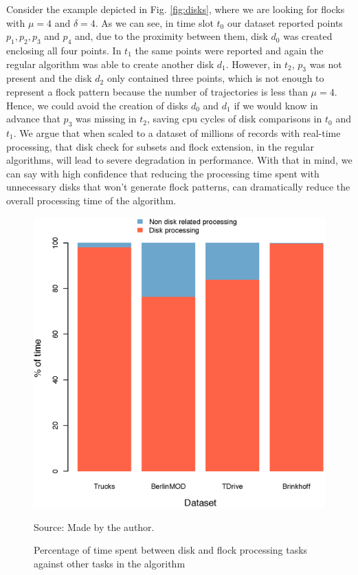 Consider the example depicted in Fig. \ref{fig:disks}, where we are looking for flocks with $\mu=4$ and $\delta=4$. As
we can see, in time slot $t_0$ our dataset reported points $p_1,p_2,p_3$ and $p_4$ and, due to the proximity between
them, disk $d_0$ was created enclosing all four points. In $t_1$ the same points were reported and again the regular
algorithm was able to create another disk $d_1$. However, in $t_2$, $p_3$ was not present and the disk $d_2$ only
contained three points, which is not enough to represent a flock pattern because the number of trajectories is less than
$\mu = 4$. Hence, we could avoid the creation of disks $d_0$ and $d_1$ if we would know in advance that $p_3$ was
missing in $t_2$, saving \ac{cpu} cycles of disk comparisons in $t_0$ and $t_1$. We argue that when scaled to a dataset
of millions of records with real-time processing, that disk check for subsets and flock extension, in the regular
algorithms, will lead to severe degradation in performance. With that in mind, we can say with high confidence that
reducing the processing time spent with unnecessary disks that won't generate flock patterns, can dramatically reduce
the overall processing time of the algorithm.

\begin{figure}[h!]
    \centering
    \caption{Percentage of time spent between disk and flock processing tasks against other tasks in the algorithm}
    \centerline{\includegraphics[width=0.7\linewidth]{images/timeConsumption.eps}}
    \footnotesize{Source: Made by the author.}
    \label{fig:time_consumption}
\end{figure}

